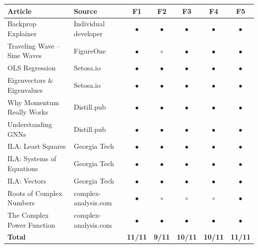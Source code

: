 \begin{minipage}{\textwidth}
\centering
\begin{tabular}{@{}llccccc@{}}
\toprule
\textbf{Article} & \textbf{Source} & \textbf{F1} & \textbf{F2} & \textbf{F3} & \textbf{F4} & \textbf{F5} \\
\midrule
Backprop Explainer            & Individual developer    & $\bullet$ & $\bullet$ & $\bullet$ & $\bullet$ & $\bullet$ \\
Traveling Wave -- Sine Waves  & FigureOne               & $\bullet$ & $\circ$   & $\bullet$ & $\bullet$ & $\bullet$ \\
OLS Regression                & Setosa.io               & $\bullet$ & $\bullet$ & $\bullet$ & $\bullet$ & $\bullet$ \\
Eigenvectors \& Eigenvalues   & Setosa.io               & $\bullet$ & $\bullet$ & $\bullet$ & $\bullet$ & $\bullet$ \\
Why Momentum Really Works     & Distill.pub             & $\bullet$ & $\bullet$ & $\bullet$ & $\bullet$ & $\bullet$ \\
Understanding GNNs            & Distill.pub             & $\bullet$ & $\bullet$ & $\bullet$ & $\bullet$ & $\bullet$ \\
ILA: Least Squares            & Georgia Tech            & $\bullet$ & $\bullet$ & $\bullet$ & $\bullet$ & $\bullet$ \\
ILA: Systems of Equations     & Georgia Tech            & $\bullet$ & $\bullet$ & $\bullet$ & $\bullet$ & $\bullet$ \\
ILA: Vectors                  & Georgia Tech            & $\bullet$ & $\bullet$ & $\bullet$ & $\bullet$ & $\bullet$ \\
Roots of Complex Numbers      & complex-analysis.com    & $\bullet$ & $\circ$   & $\circ$   & $\circ$   & $\bullet$ \\
The Complex Power Function    & complex-analysis.com    & $\bullet$ & $\bullet$ & $\bullet$ & $\bullet$ & $\bullet$ \\
\midrule
\textbf{Total}                &                         & \textbf{11/11} & \textbf{9/11} & \textbf{10/11} & \textbf{10/11} & \textbf{11/11} \\
\bottomrule
\end{tabular}
\label{tab:formative-audit}
\end{minipage}

